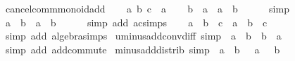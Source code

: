 \begin{isabellebody}
\endisatagproof
{\isafoldproof}%
%
\isadelimproof
\isanewline
%
\endisadelimproof
\isanewline
{}\isamarkupfalse%
\ cancel{\isacharunderscore}{\kern0pt}comm{\isacharunderscore}{\kern0pt}monoid{\isacharunderscore}{\kern0pt}add\isanewline
%
\isadelimproof
%
\endisadelimproof
%
\isatagproof
{}\isamarkupfalse%
\isanewline
\ \ \isamarkupfalse%
\ a\ b\ c\ {\isacharcolon}{\kern0pt}{\isacharcolon}{\kern0pt}\ {\isacharprime}{\kern0pt}a\isanewline
\ \ \isamarkupfalse%
\ {\isachardoublequoteopen}b\ {\isacharplus}{\kern0pt}\ a\ {\isacharminus}{\kern0pt}\ a\ {\isacharequal}{\kern0pt}\ b{\isachardoublequoteclose}\isanewline
\ \ \ \ \isamarkupfalse%
\ simp\isanewline
\ \ \isamarkupfalse%
\ \isamarkupfalse%
\ {\isachardoublequoteopen}a\ {\isacharplus}{\kern0pt}\ b\ {\isacharminus}{\kern0pt}\ a\ {\isacharequal}{\kern0pt}\ b{\isachardoublequoteclose}\isanewline
\ \ \ \ \isamarkupfalse%
\ {\isacharparenleft}{\kern0pt}simp\ add{\isacharcolon}{\kern0pt}\ ac{\isacharunderscore}{\kern0pt}simps{\isacharparenright}{\kern0pt}\isanewline
\ \ \isamarkupfalse%
\ {\isachardoublequoteopen}a\ {\isacharminus}{\kern0pt}\ b\ {\isacharminus}{\kern0pt}\ c\ {\isacharequal}{\kern0pt}\ a\ {\isacharminus}{\kern0pt}\ {\isacharparenleft}{\kern0pt}b\ {\isacharplus}{\kern0pt}\ c{\isacharparenright}{\kern0pt}{\isachardoublequoteclose}\isanewline
\ \ \ \ \isamarkupfalse%
\ {\isacharparenleft}{\kern0pt}simp\ add{\isacharcolon}{\kern0pt}\ algebra{\isacharunderscore}{\kern0pt}simps{\isacharparenright}{\kern0pt}\isanewline
{}\isamarkupfalse%
%
\endisatagproof
{\isafoldproof}%
%
\isadelimproof
\isanewline
%
\endisadelimproof
\isanewline
{}\isamarkupfalse%
\ uminus{\isacharunderscore}{\kern0pt}add{\isacharunderscore}{\kern0pt}conv{\isacharunderscore}{\kern0pt}diff\ {\isacharbrackleft}{\kern0pt}simp{\isacharbrackright}{\kern0pt}{\isacharcolon}{\kern0pt}\ {\isachardoublequoteopen}{\isacharminus}{\kern0pt}\ a\ {\isacharplus}{\kern0pt}\ b\ {\isacharequal}{\kern0pt}\ b\ {\isacharminus}{\kern0pt}\ a{\isachardoublequoteclose}\isanewline
%
\isadelimproof
\ \ %
\endisadelimproof
%
\isatagproof
{}\isamarkupfalse%
\ {\isacharparenleft}{\kern0pt}simp\ add{\isacharcolon}{\kern0pt}\ add{\isachardot}{\kern0pt}commute{\isacharparenright}{\kern0pt}%
\endisatagproof
{\isafoldproof}%
%
\isadelimproof
\isanewline
%
\endisadelimproof
\isanewline
{}\isamarkupfalse%
\ minus{\isacharunderscore}{\kern0pt}add{\isacharunderscore}{\kern0pt}distrib\ {\isacharbrackleft}{\kern0pt}simp{\isacharbrackright}{\kern0pt}{\isacharcolon}{\kern0pt}\ {\isachardoublequoteopen}{\isacharminus}{\kern0pt}\ {\isacharparenleft}{\kern0pt}a\ {\isacharplus}{\kern0pt}\ b{\isacharparenright}{\kern0pt}\ {\isacharequal}{\kern0pt}\ {\isacharminus}{\kern0pt}\ a\ {\isacharplus}{\kern0pt}\ {\isacharminus}{\kern0pt}\ b{\isachardoublequoteclose}\isanewline

\end{isabellebody}
